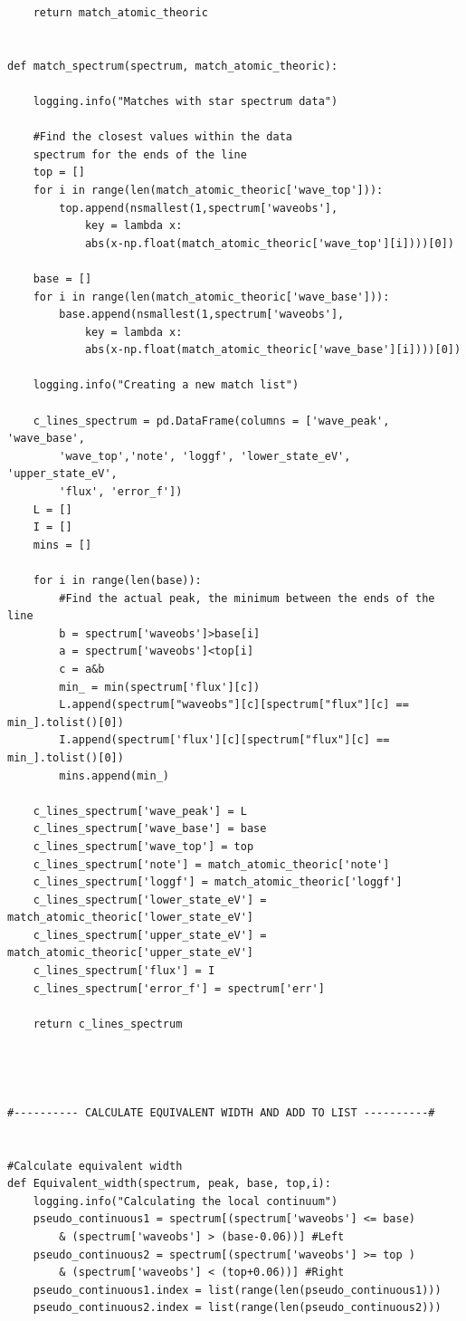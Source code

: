 \documentclass[12pt,oneside,openany,letter]{book}
\begin{document}
\begin{verbatim}
    return match_atomic_theoric


def match_spectrum(spectrum, match_atomic_theoric):

    logging.info("Matches with star spectrum data")

    #Find the closest values within the data 
    spectrum for the ends of the line
    top = []
    for i in range(len(match_atomic_theoric['wave_top'])):
        top.append(nsmallest(1,spectrum['waveobs'], 
            key = lambda x:
            abs(x-np.float(match_atomic_theoric['wave_top'][i])))[0])

    base = []
    for i in range(len(match_atomic_theoric['wave_base'])):
        base.append(nsmallest(1,spectrum['waveobs'],
            key = lambda x:
            abs(x-np.float(match_atomic_theoric['wave_base'][i])))[0])

    logging.info("Creating a new match list")

    c_lines_spectrum = pd.DataFrame(columns = ['wave_peak', 'wave_base',
        'wave_top','note', 'loggf', 'lower_state_eV', 'upper_state_eV',
        'flux', 'error_f'])
    L = []
    I = []
    mins = []
       
    for i in range(len(base)):
        #Find the actual peak, the minimum between the ends of the line
        b = spectrum['waveobs']>base[i]
        a = spectrum['waveobs']<top[i]
        c = a&b 
        min_ = min(spectrum['flux'][c])
        L.append(spectrum["waveobs"][c][spectrum["flux"][c] == min_].tolist()[0])
        I.append(spectrum['flux'][c][spectrum["flux"][c] == min_].tolist()[0])
        mins.append(min_)
    
    c_lines_spectrum['wave_peak'] = L
    c_lines_spectrum['wave_base'] = base
    c_lines_spectrum['wave_top'] = top
    c_lines_spectrum['note'] = match_atomic_theoric['note']
    c_lines_spectrum['loggf'] = match_atomic_theoric['loggf']
    c_lines_spectrum['lower_state_eV'] = match_atomic_theoric['lower_state_eV']
    c_lines_spectrum['upper_state_eV'] = match_atomic_theoric['upper_state_eV']
    c_lines_spectrum['flux'] = I
    c_lines_spectrum['error_f'] = spectrum['err']

    return c_lines_spectrum




#---------- CALCULATE EQUIVALENT WIDTH AND ADD TO LIST ----------#


#Calculate equivalent width
def Equivalent_width(spectrum, peak, base, top,i):
    logging.info("Calculating the local continuum")
    pseudo_continuous1 = spectrum[(spectrum['waveobs'] <= base)  
        & (spectrum['waveobs'] > (base-0.06))] #Left
    pseudo_continuous2 = spectrum[(spectrum['waveobs'] >= top )  
        & (spectrum['waveobs'] < (top+0.06))] #Right
    pseudo_continuous1.index = list(range(len(pseudo_continuous1)))
    pseudo_continuous2.index = list(range(len(pseudo_continuous2)))


\end{verbatim}
\end{document}
